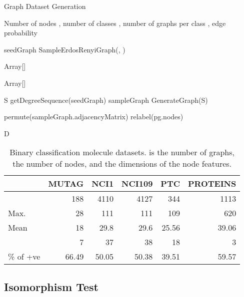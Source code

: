 \documentclass{article}
\theoremstyle{definition}
\begin{document}
\begin{algorithm}[htb]
  \small
   \caption{Graph Dataset Generation}
   \label{alg:graphGen}
\begin{algorithmic}


 Number of nodes ,
number of classes ,
number of graphs per class ,
edge probability 
    										  
    
\STATE seedGraph  SampleErdosRenyiGraph(, )
 \ENDWHILE

\STATE   Array[]


	\STATE   Array[]
	
	
	\STATE S  getDegreeSequence(seedGraph)
	\STATE sampleGraph   GenerateGraph(S)	
	
	
	
		\STATE   permute(sampleGraph.adjacencyMatrix)
		\STATE   relabel(pg.nodes)
		
		\STATE   
		
\ENDFOR
	\STATE   
\ENDFOR

 D
 

\end{algorithmic}
\end{algorithm}

\begin{table}[b]
  \small
  \centering
  \begin{tabularx}{\linewidth}{lrrrrr}
  \toprule
 & MUTAG & NCI1 & NCI109 & PTC & PROTEINS \\ \midrule
  & 188 & 4110 & 4127 & 344 & 1113 \\
 Max.  & 28 & 111 & 111 & 109 & 620 \\
 Mean  & 18 & 29.8 & 29.6 & 25.56 & 39.06 \\
  & 7 & 37 & 38 & 18 & 3 \\
 \% of +ve & 66.49 & 50.05 & 50.38 & 39.51 & 59.57 \\
\bottomrule
\end{tabularx}
\caption{Binary classification molecule datasets.  is the number of graphs,  the number of nodes, and  the dimensions of the node features.}
\label{tbl:graphstats}
\end{table}

\subsection{Isomorphism Test}
\label{sse:isomorphismexp}
\end{document}

